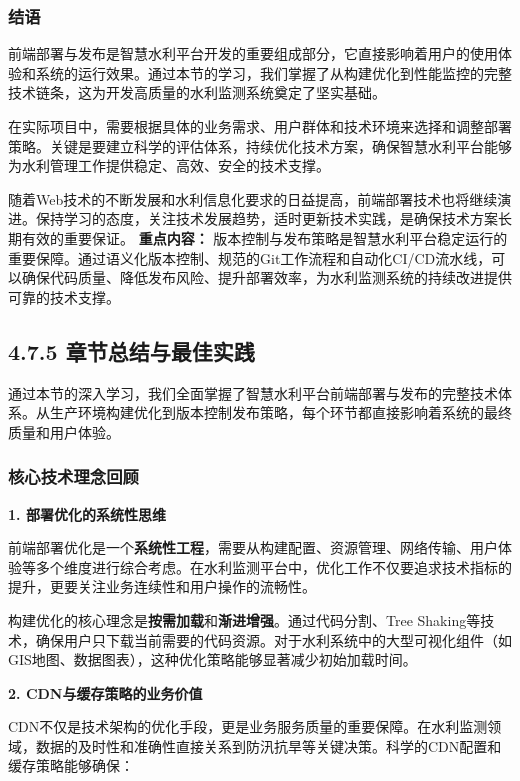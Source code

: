 \subsubsection{结语}\label{ux7ed3ux8bed}

前端部署与发布是智慧水利平台开发的重要组成部分，它直接影响着用户的使用体验和系统的运行效果。通过本节的学习，我们掌握了从构建优化到性能监控的完整技术链条，这为开发高质量的水利监测系统奠定了坚实基础。

在实际项目中，需要根据具体的业务需求、用户群体和技术环境来选择和调整部署策略。关键是要建立科学的评估体系，持续优化技术方案，确保智慧水利平台能够为水利管理工作提供稳定、高效、安全的技术支撑。

随着Web技术的不断发展和水利信息化要求的日益提高，前端部署技术也将继续演进。保持学习的态度，关注技术发展趋势，适时更新技术实践，是确保技术方案长期有效的重要保证。 \textbf{重点内容：} 版本控制与发布策略是智慧水利平台稳定运行的重要保障。通过语义化版本控制、规范的Git工作流程和自动化CI/CD流水线，可以确保代码质量、降低发布风险、提升部署效率，为水利监测系统的持续改进提供可靠的技术支撑。

\subsection{4.7.5 章节总结与最佳实践}\label{ux7ae0ux8282ux603bux7ed3ux4e0eux6700ux4f73ux5b9eux8df5-1}

通过本节的深入学习，我们全面掌握了智慧水利平台前端部署与发布的完整技术体系。从生产环境构建优化到版本控制发布策略，每个环节都直接影响着系统的最终质量和用户体验。

\subsubsection{核心技术理念回顾}\label{ux6838ux5fc3ux6280ux672fux7406ux5ff5ux56deux987e}

\textbf{1. 部署优化的系统性思维}

前端部署优化是一个\textbf{系统性工程}，需要从构建配置、资源管理、网络传输、用户体验等多个维度进行综合考虑。在水利监测平台中，优化工作不仅要追求技术指标的提升，更要关注业务连续性和用户操作的流畅性。

构建优化的核心理念是\textbf{按需加载}和\textbf{渐进增强}。通过代码分割、Tree Shaking等技术，确保用户只下载当前需要的代码资源。对于水利系统中的大型可视化组件（如GIS地图、数据图表），这种优化策略能够显著减少初始加载时间。

\textbf{2. CDN与缓存策略的业务价值}

CDN不仅是技术架构的优化手段，更是业务服务质量的重要保障。在水利监测领域，数据的及时性和准确性直接关系到防汛抗旱等关键决策。科学的CDN配置和缓存策略能够确保：

